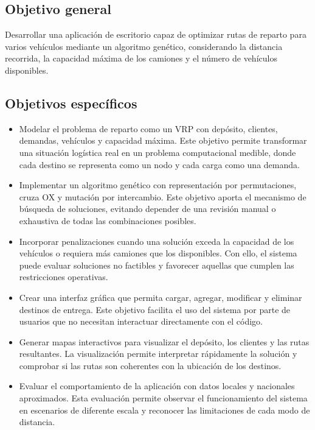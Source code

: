 \documentclass[runningheads]{llncs}
\begin{document}
\subsection{Objetivo general}

Desarrollar una aplicaci\'on de escritorio capaz de optimizar rutas de reparto
para varios veh\'iculos mediante un algoritmo gen\'etico, considerando la distancia
recorrida, la capacidad m\'axima de los camiones y el n\'umero de veh\'iculos
disponibles.

\subsection{Objetivos espec\'ificos}

\begin{itemize}
    \item Modelar el problema de reparto como un VRP con dep\'osito, clientes,
    demandas, veh\'iculos y capacidad m\'axima. Este objetivo permite transformar
    una situaci\'on log\'istica real en un problema computacional medible, donde
    cada destino se representa como un nodo y cada carga como una demanda.
    \item Implementar un algoritmo gen\'etico con representaci\'on por
    permutaciones, cruza OX y mutaci\'on por intercambio. Este objetivo aporta el
    mecanismo de b\'usqueda de soluciones, evitando depender de una revisi\'on
    manual o exhaustiva de todas las combinaciones posibles.
    \item Incorporar penalizaciones cuando una soluci\'on exceda la capacidad de
    los veh\'iculos o requiera m\'as camiones que los disponibles. Con ello, el
    sistema puede evaluar soluciones no factibles y favorecer aquellas que
    cumplen las restricciones operativas.
    \item Crear una interfaz gr\'afica que permita cargar, agregar, modificar y
    eliminar destinos de entrega. Este objetivo facilita el uso del sistema por
    parte de usuarios que no necesitan interactuar directamente con el c\'odigo.
    \item Generar mapas interactivos para visualizar el dep\'osito, los clientes
    y las rutas resultantes. La visualizaci\'on permite interpretar r\'apidamente
    la soluci\'on y comprobar si las rutas son coherentes con la ubicaci\'on de los
    destinos.
    \item Evaluar el comportamiento de la aplicaci\'on con datos locales y
    nacionales aproximados. Esta evaluaci\'on permite observar el funcionamiento
    del sistema en escenarios de diferente escala y reconocer las limitaciones
    de cada modo de distancia.
\end{itemize}
\end{document}
